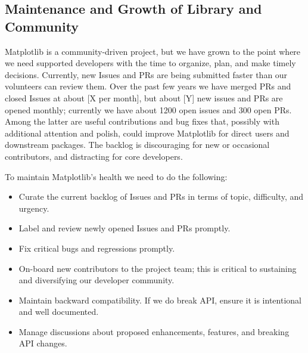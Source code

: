 \documentclass[11pt]{article}  %
\begin{document}
\subsection{Maintenance and Growth of Library and Community}


Matplotlib is a community-driven project, but we have grown to the point
where we need supported developers with the time to organize, plan, and
make timely decisions.  Currently, new Issues and PRs are
being submitted faster than our volunteers can review them.  Over the
past few years we have merged PRs and closed Issues at about [X per
  month], but about [Y] new issues and PRs are opened monthly;
currently we have about 1200 open issues and 300 open PRs.  Among the
latter are useful contributions and bug fixes that, possibly with
additional attention and polish, could improve Matplotlib for direct
users and downstream packages.  The backlog is discouraging for new or
occasional contributors, and distracting for core developers.

To maintain Matplotlib's health we need to do the following:

\begin{itemize}[noitemsep]
\item Curate the current backlog of Issues and PRs
  in terms of topic, difficulty, and urgency.
\item Label and review newly opened Issues and PRs
  promptly.
\item Fix critical bugs and regressions promptly.
\item On-board new contributors to the project team; this is critical to
  sustaining and diversifying our developer community.
\item Maintain backward compatibility.  If we do break API, ensure it
  is intentional and well documented.
\item Manage discussions about proposed enhancements, features, and
  breaking API changes.
\end{itemize}
\end{document}
